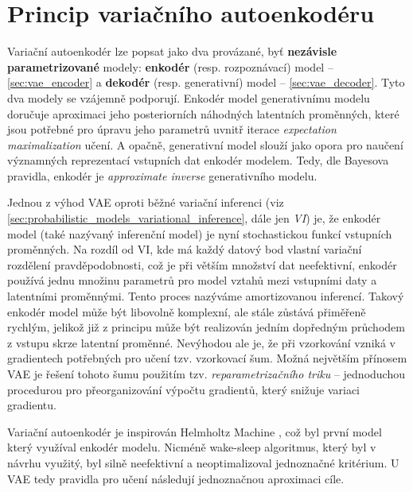 \section{Princip variačního autoenkodéru}
Variační autoenkodér lze popsat jako dva provázané, byť \textbf{nezávisle parametrizované} modely: \textbf{enkodér} (resp. rozpoznávací) model – \autoref{sec:vae_encoder} a \textbf{dekodér} (resp. generativní) model – \autoref{sec:vae_decoder}.
Tyto dva modely se vzájemně podporují. Enkodér model generativnímu modelu doručuje aproximaci jeho posteriorních náhodných latentních proměnných,
které jsou potřebné pro úpravu jeho parametrů uvnitř iterace \emph{expectation maximalization} učení.
A opačně, generativní model slouží jako opora pro naučení významných reprezentací vstupních dat enkodér modelem.
Tedy, dle Bayesova pravidla, enkodér je \emph{approximate inverse} generativního modelu.

Jednou z výhod VAE oproti běžné variační inferenci (viz \autoref{sec:probabilistic_models_variational_inference}, dále jen \emph{VI}) je, že enkodér model (také nazývaný inferenční model) je nyní stochastickou funkcí vstupních proměnných.
Na rozdíl od VI, kde má každý datový bod vlastní variační rozdělení pravděpodobnosti, což je při větším množství dat neefektivní,
enkodér používá jednu množinu parametrů pro model vztahů mezi vstupními daty a latentními proměnnými. Tento proces nazýváme amortizovanou inferencí.
Takový enkodér model může být libovolně komplexní, ale stále zůstává přiměřeně rychlým, jelikož již z principu může být realizován jedním dopředným průchodem z vstupu skrze latentní proměnné.
Nevýhodou ale je, že při vzorkování vzniká v gradientech potřebných pro učení tzv. vzorkovací šum. Možná největším přínosem VAE je řešení tohoto šumu použitím tzv. \emph{reparametrizačního triku} – jednoduchou procedurou pro přeorganizování výpočtu gradientů, který snižuje variaci gradientu.

Variační autoenkodér je inspirován Helmholtz Machine \cite{Dayan1995}, což byl první model který využíval enkodér modelu.
Nicméně wake-sleep algoritmus, který byl v návrhu využitý, byl silně neefektivní a neoptimalizoval jednoznačné kritérium.
U VAE tedy pravidla pro učení následují jednoznačnou aproximaci cíle.

